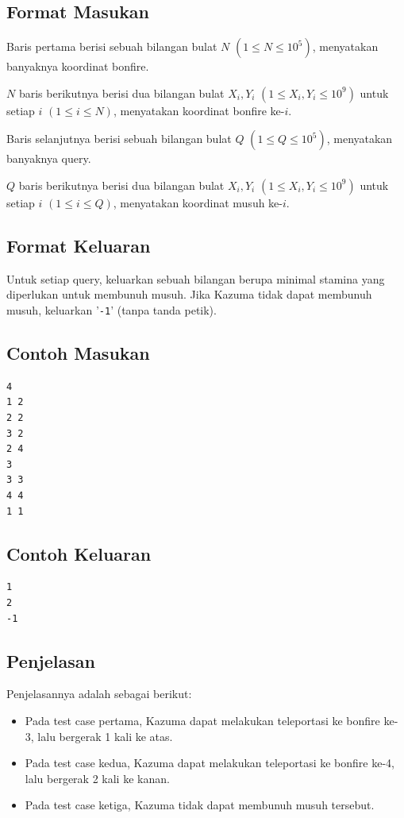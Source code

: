 \documentclass{article}
\begin{document}
\subsection*{Format Masukan}

Baris pertama berisi sebuah bilangan bulat $N$ $(1 \leq N \leq 10^5)$, menyatakan banyaknya koordinat bonfire.

$N$ baris berikutnya berisi dua bilangan bulat $X_i, Y_i$ $(1 \leq X_i, Y_i \leq 10^9)$ untuk setiap $i$ $(1 \leq i \leq N)$, menyatakan koordinat bonfire ke-$i$.

Baris selanjutnya berisi sebuah bilangan bulat $Q$ $(1 \leq Q \leq 10^5)$, menyatakan banyaknya query.

$Q$ baris berikutnya berisi dua bilangan bulat $X_i, Y_i$ $(1 \leq X_i, Y_i \leq 10^9)$ untuk setiap $i$ $(1 \leq i \leq Q)$, menyatakan koordinat musuh ke-$i$.

\subsection*{Format Keluaran}
Untuk setiap query, keluarkan sebuah bilangan berupa minimal stamina yang diperlukan untuk membunuh musuh. Jika Kazuma tidak dapat membunuh musuh, keluarkan '\lstinline|-1|' (tanpa tanda petik).

\begin{multicols}{2}
\subsection*{Contoh Masukan}
\begin{lstlisting}
4
1 2
2 2
3 2
2 4
3
3 3
4 4
1 1
\end{lstlisting}
\columnbreak
\subsection*{Contoh Keluaran}
\begin{lstlisting}
1
2
-1
\end{lstlisting}
\vfill
\null
\end{multicols}

\subsection*{Penjelasan}
Penjelasannya adalah sebagai berikut:
\begin{itemize}
    \item Pada test case pertama, Kazuma dapat melakukan teleportasi ke bonfire ke-3, lalu bergerak 1 kali ke atas.
    \item Pada test case kedua, Kazuma dapat melakukan teleportasi ke bonfire ke-4, lalu bergerak 2 kali ke kanan.
    \item Pada test case ketiga, Kazuma tidak dapat membunuh musuh tersebut.
\end{itemize}

\pagebreak
\end{document}
